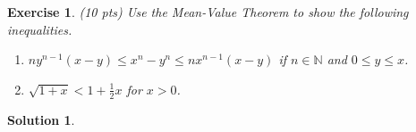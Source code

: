 \documentclass[12pt]{article}
\newcommand{\bN}{\mathbb{N}}
\theoremstyle{plain}
\newtheorem{exer}{\textbf{Exercise}}}
\theoremstyle{plain}
\newtheorem*{sol}{\textbf{Solution}}}
\begin{document}
\begin{exer}
(10 pts)
Use the Mean-Value Theorem to show the following inequalities.
	\begin{enumerate}[label=\textbf{\alph*)}]
	\item $n y^{n-1} (x - y) \leq x^n - y^n \leq n x^{n-1} (x - y)$ if $n \in \bN$ and $0 \leq y \leq x$.
	\item $\sqrt{1 + x} < 1 + \frac{1}{2} x$ for $x > 0$.
	\end{enumerate}
\end{exer}
\begin{sol}

\end{sol}
\end{document}
